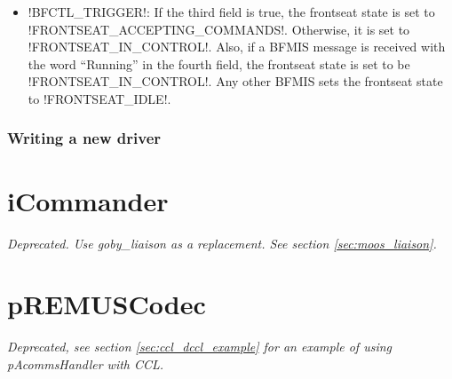 \begin{itemize}
\begin{itemize}
\item !BFCTL_TRIGGER!: If the third field is true, the frontseat state is set to !FRONTSEAT_ACCEPTING_COMMANDS!. Otherwise, it is set to !FRONTSEAT_IN_CONTROL!. Also, if a BFMIS message is received with the word ``Running'' in the fourth field, the frontseat state is set to be !FRONTSEAT_IN_CONTROL!.  Any other BFMIS sets the frontseat state to !FRONTSEAT_IDLE!.
\end{itemize} 
\end{itemize}


\subsubsection{Writing a new driver}



\section{iCommander}\label{sec:icommander} 

\textit{Deprecated. Use goby\_liaison as a replacement. See section \ref{sec:moos_liaison}.}

\section{pREMUSCodec}

\textit{Deprecated, see section \ref{sec:ccl_dccl_example} for an example of using pAcommsHandler with CCL.}

\DeleteShortVerb{\!}
